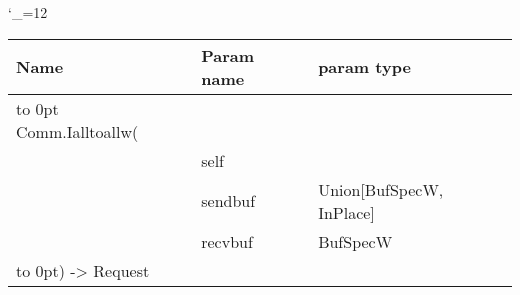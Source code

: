 \begingroup \catcode`\_=12 \tt
\begin{tabular}{lll}
\toprule
\textrm{Name}&\textrm{Param name}&\textrm{param type}\\
\midrule
\hbox to 0pt {Comm.Ialltoallw(\hss}\\
& self\\
& sendbuf & Union[BufSpecW, InPlace]\\
& recvbuf & BufSpecW\\
\hbox to 0pt{) -> Request\hss}\\
\bottomrule
\end{tabular}
\endgroup
